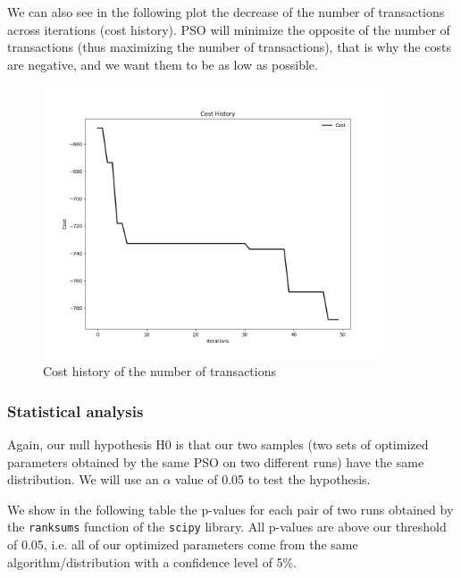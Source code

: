             We can also see in the following plot the decrease of the number of transactions across iterations (cost history). PSO will minimize the opposite of the number of transactions (thus maximizing the number of transactions), that is why the costs are negative, and we want them to be as low as possible.

            \begin{figure}[H]
                \centering
                \includegraphics[width=0.9\textwidth]{img/opti/costHistoryNbTransactions.png}
                \caption{Cost history of the number of transactions}
            \end{figure}


        \subsubsection{Statistical analysis}

        Again, our null hypothesis H0 is that our two samples (two sets of optimized parameters obtained by the same PSO on two different runs) have the same distribution. We will use an $\alpha$ value of 0.05 to test the hypothesis. 

        We show in the following table the p-values for each pair of two runs obtained by the \texttt{ranksums} function of the \texttt{scipy} library. All p-values are above our threshold of 0.05, i.e. all of our optimized parameters come from the same algorithm/distribution with a confidence level of 5\%.

